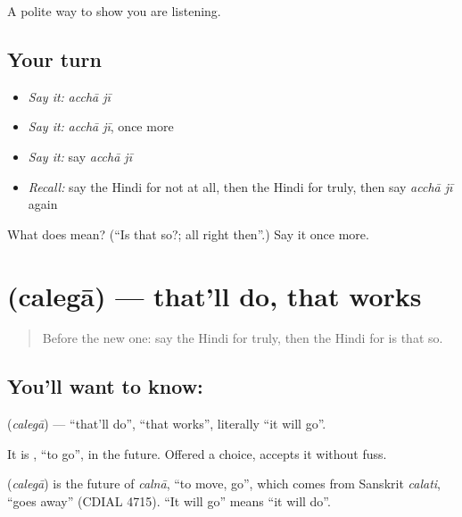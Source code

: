 \begin{grammarlens}[title={What you've built}]
A polite way to show you are listening.
\end{grammarlens}

\subsection*{Your turn}
\begin{itemize}
\raggedright
  \item \emph{Say it:} \emph{acchā jī}
  \item \emph{Say it:} \emph{acchā jī}, once more
  \item \emph{Say it:} say \emph{acchā jī}
  \item \emph{Recall:} say the Hindi for not at all, then the Hindi for truly, then say \emph{acchā jī} again
\end{itemize}

\begin{tcolorbox}[breakable,colback=teal!4,colframe=teal!35!black,title={Before you move on}]
What does   mean? (\textquotedblleft{}Is that so?; all right then\textquotedblright{}.) Say it once more.
\end{tcolorbox}
\section[\texorpdfstring{\hi{चलेगा} (calegā)}{चलेगा (calegā)}]{ (calegā) — that'll do, that works}

\label{lesson:HI-C127-chalega}



\begin{quote}
Before the new one: say the Hindi for truly, then the Hindi for is that so.
\end{quote}

\subsection*{You'll want to know: }
\textbf{} (\emph{calegā}) — \textquotedblleft{}that'll do\textquotedblright{}, \textquotedblleft{}that works\textquotedblright{}, literally \textquotedblleft{}it will go\textquotedblright{}.

It is \textbf{}, \textquotedblleft{}to go\textquotedblright{}, in the future. Offered a choice, \textbf{} accepts it without fuss.

\begin{cousinweb}
\textbf{} (\emph{calegā}) is the future of \emph{calnā}, \textquotedblleft{}to move, go\textquotedblright{}, which comes from Sanskrit \emph{calati}, \textquotedblleft{}goes away\textquotedblright{} (CDIAL 4715). \textquotedblleft{}It will go\textquotedblright{} means \textquotedblleft{}it will do\textquotedblright{}.
\end{cousinweb}

